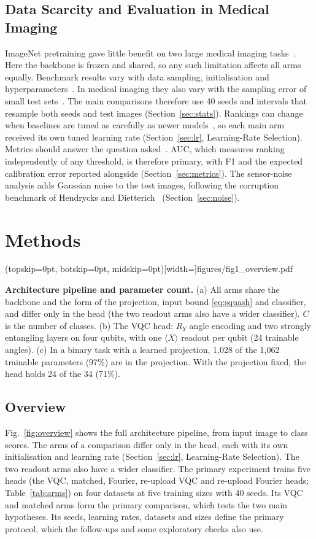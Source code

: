 \documentclass{ieeeaccess}
\newcommand{\vqc}{VQC}
\newcommand{\widecap}[1]{\parbox[t]{0.87\textwidth}{#1}}
\begin{document}
\subsection{Data Scarcity and Evaluation in Medical Imaging}
ImageNet pretraining gave little benefit on two large medical imaging tasks~\cite{raghu2019}. Here the backbone is frozen and shared, so any such limitation affects all arms equally. Benchmark results vary with data sampling, initialisation and hyperparameters~\cite{bouthillier2021}. In medical imaging they also vary with the sampling error of small test sets~\cite{varoquaux2022}. The main comparisons therefore use 40 seeds and intervals that resample both seeds and test images (Section~\ref{sec:stats}). Rankings can change when baselines are tuned as carefully as newer models~\cite{melis2018}, so each main arm received its own tuned learning rate (Section~\ref{sec:lr}, Learning-Rate Selection). Metrics should answer the question asked~\cite{maierhein2024}. AUC, which measures ranking independently of any threshold, is therefore primary, with F1 and the expected calibration error reported alongside (Section~\ref{sec:metrics}). The sensor-noise analysis adds Gaussian noise to the test images, following the corruption benchmark of Hendrycks and Dietterich~\cite{hendrycks2019} (Section~\ref{sec:noise}).

\section{Methods}
\label{sec:methods}

\Figure[t!](topskip=0pt, botskip=0pt, midskip=0pt)[width=\textwidth]{figures/fig1_overview.pdf}
{\widecap{\textbf{Architecture pipeline and parameter count.} (a) All arms share the backbone and the form of the projection, input bound \eqref{eq:squash} and classifier, and differ only in the head (the two readout arms also have a wider classifier). $C$ is the number of classes. (b) The \vqc{} head: $R_Y$ angle encoding and two strongly entangling layers on four qubits, with one $\langle X\rangle$ readout per qubit (24 trainable angles). (c) In a binary task with a learned projection, 1,028 of the 1,062 trainable parameters (97\%) are in the projection. With the projection fixed, the head holds 24 of the 34 (71\%).}\label{fig:overview}}

\subsection{Overview}
Fig.~\ref{fig:overview} shows the full architecture pipeline, from input image to class scores. The arms of a comparison differ only in the head, each with its own initialisation and learning rate (Section~\ref{sec:lr}, Learning-Rate Selection). The two readout arms also have a wider classifier. The primary experiment trains five heads (the \vqc{}, matched, Fourier, re-upload \vqc{} and re-upload Fourier heads; Table~\ref{tab:arms}) on four datasets at five training sizes with 40 seeds. Its \vqc{} and matched arms form the primary comparison, which tests the two main hypotheses. Its seeds, learning rates, datasets and sizes define the primary protocol, which the follow-ups and some exploratory checks also use.
\end{document}
